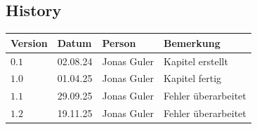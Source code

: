 \documentclass[11pt,oneside]{article}
\begin{document}
\newpage
\subsection*{History}
\begin{table}[H]
	\centering
	\begin{tabular}{|p{13mm}|p{20mm}|p{30mm}|p{70mm}|}\hline
		Version & Datum & Person & Bemerkung \\\hline
		$0.1$ & 02.08.24 & Jonas Guler & Kapitel erstellt \\\hline
		$1.0$ & 01.04.25 & Jonas Guler & Kapitel fertig \\\hline
		$1.1$ & 29.09.25 & Jonas Guler & Fehler überarbeitet \\\hline
		$1.2$ & 19.11.25 & Jonas Guler & Fehler überarbeitet \\\hline
	\end{tabular}
\end{table}
\end{document}
